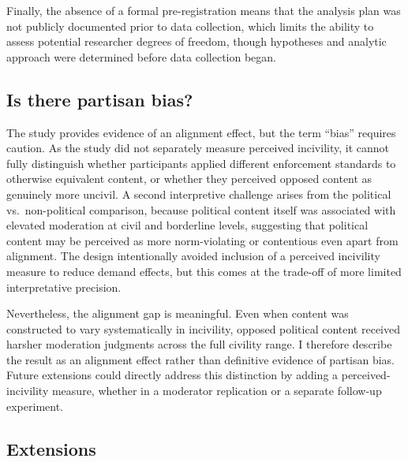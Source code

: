 \documentclass[12pt]{article}
\begin{document}
Finally, the absence of a formal pre-registration means that the analysis plan was not publicly documented prior to data collection, which limits the ability to assess potential researcher degrees of freedom, though hypotheses and analytic approach were determined before data collection began.



\subsection{Is there partisan bias?}

The study provides evidence of an alignment effect, but the term \enquote{bias} requires caution. As the study did not separately measure perceived incivility, it cannot fully distinguish whether participants applied different enforcement standards to otherwise equivalent content, or whether they perceived opposed content as genuinely more uncivil. A second interpretive challenge arises from the political vs.\ non-political comparison, because political content itself was associated with elevated moderation at civil and borderline levels, suggesting that political content may be perceived as more norm-violating or contentious even apart from alignment. The design intentionally avoided inclusion of a perceived incivility measure to reduce demand effects, but this comes at the trade-off of more limited interpretative precision.

Nevertheless, the alignment gap is meaningful. Even when content was constructed to vary systematically in incivility, opposed political content received harsher moderation judgments across the full civility range. I therefore describe the result as an alignment effect rather than definitive evidence of partisan bias. Future extensions could directly address this distinction by adding a perceived-incivility measure, whether in a moderator replication or a separate follow-up experiment.

\subsection{Extensions}
\end{document}
